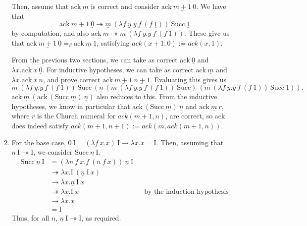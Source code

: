 \documentclass{article}
\begin{document}
\begin{enumerate}
\begin{enumerate}[label=\arabic*.]
        Then, assume that $\mathrm{ack}~\underline m$ is correct and consider $\mathrm{ack}~\underline{m+1}~\underline 0$. We have that \[\mathrm{ack}~\underline{m+1}~\underline 0 \twoheadrightarrow \underline m~(\lambda f~y.y~f~(f~\underline 1))~\mathrm{Succ}~\underline 1\] by computation, and also $\mathrm{ack}~\underline m \twoheadrightarrow m~(\lambda f~y.y~f~(f~\underline 1))$. These give us that $\mathrm{ack}~\underline{m+1}~\underline 0 =_\beta \mathrm{ack}~\underline m~\underline 1$, satisfying $\mathit{ack}(x + 1, 0) := \mathit{ack}(x, 1)$.

        From the previous two sections, we can take as correct $\mathrm{ack}~\underline 0$ and $\lambda x.\mathrm{ack}~x~\underline 0$. For inductive hypotheses, we can take as correct $\mathrm{ack}~\underline m$ and $\lambda x.\mathrm{ack}~x~\underline n$, and prove correct $\mathrm{ack}~\underline{m+1}~\underline{n+1}$. Evaluating this gives us \[\underline m~(\lambda f~y.y~f~(f~\underline 1))~\mathrm{Succ}~(\underline n~(\underline m~(\lambda f~y.y~f~(f~\underline 1))~\mathrm{Succ})~(\underline m~(\lambda f~y.y~f~(f~\underline 1))~\mathrm{Succ}~\underline 1)).\] $\mathrm{ack}~\underline m~(\mathrm{ack}~(\mathrm{Succ}~\underline m)~\underline n)$ also reduces to this. From the inductive hypotheses, we know in particular that $\mathrm{ack}~(\mathrm{Succ}~\underline m)~\underline n$ and $\mathrm{ack}~\underline m~r$, where $r$ is the Church numeral for $\mathit{ack}(m + 1, n)$, are correct, so $\mathrm{ack}$ does indeed satisfy $\mathit{ack}(m + 1, n + 1) := \mathit{ack}(m, \mathit{ack}(m + 1, n))$.
      \item
        For the base case, $\underline 0~\mathrm I = (\lambda f~x.x)~\mathrm I \to \lambda x.x = \mathrm I$. Then, assuming that $\underline n~\mathrm I \twoheadrightarrow \mathrm I$, we consider $\mathrm{Succ}~\underline n~\mathrm I$.
        \begin{align*}
          \mathrm{Succ}~\underline n~\mathrm I & = (\lambda n~f~x.f~(n~f~x))~\underline n~\mathrm I
          \\
          & \twoheadrightarrow \lambda x.\mathrm I~(\underline n~\mathrm I~x)
          \\
          & \rightarrow \lambda x.\underline n~\mathrm I~x
          \\
          & \twoheadrightarrow \lambda x.\mathrm I~x && \text{by the induction hypothesis}
          \\
          & \rightarrow \lambda x.x
          \\
          & = \mathrm I
        \end{align*}
        Thus, for all $n$, $\underline n~\mathrm I \twoheadrightarrow \mathrm I$, as required.


\end{enumerate}
\end{enumerate}
\end{document}
